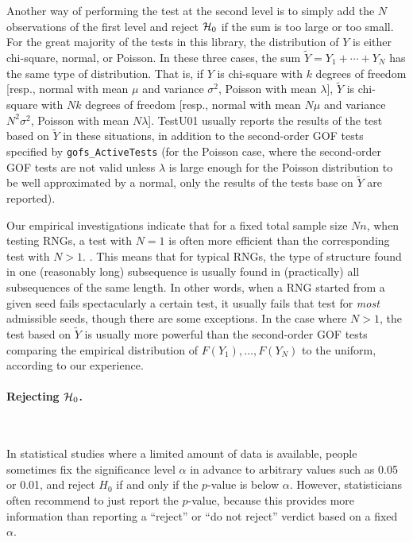 Another way of performing the test at the second level is to simply add
the $N$ observations of the first level 
and reject $\mathcal{H}_0$ if the sum is too large or too small.
For the great majority of the tests in this library, the distribution
of $Y$ is either chi-square, normal, or Poisson.
In these three cases, the sum $\tilde Y = Y_1 + \cdots + Y_N$ has the
same type of distribution.  That is, if $Y$ is chi-square with $k$ degrees
of freedom [resp., normal with mean $\mu$ and variance $\sigma^2$,
Poisson with mean $\lambda$], $\tilde Y$ is chi-square with $Nk$ degrees
of freedom [resp., normal with mean $N\mu$ and variance $N^2\sigma^2$,
Poisson with mean $N\lambda$].
TestU01 usually 
reports the results of the test based on $\tilde Y$ in
these situations, in addition to the second-order GOF tests specified
by {\tt gofs\_ActiveTests} (for the Poisson case, where the 
second-order GOF tests are not valid unless $\lambda$ is large enough
for the Poisson distribution to be well approximated by a normal,
only the results of the tests base on $\tilde Y$ are reported).

Our empirical investigations indicate that for a fixed total
sample size $Nn$, when testing RNGs, a test with $N=1$ is often
more efficient than the corresponding test with $N > 1$.
.
This means that for typical RNGs, the type of structure found in
one (reasonably long) subsequence is usually found in (practically)
all subsequences of the same length.
In other words, when a RNG started from a
given seed fails spectacularly a certain test, it usually fails
that test for {\em most\/} admissible seeds, though
there are some exceptions.
In the case where $N > 1$, the test based on $\tilde Y$ is usually
more powerful than the second-order GOF tests comparing the empirical
distribution of $F(Y_1),\dots,F(Y_N)$ to the uniform,
according to our experience.


\paragraph*{Rejecting $\mathcal{H}_0$.} \

In statistical studies where a limited amount of data is available,
people sometimes fix the significance level $\alpha$ in advance 
to arbitrary values such as 0.05 or 0.01,
and reject $H_0$ if and only if the $p$-value is below $\alpha$.
However, statisticians often recommend to just report the $p$-value,
because this provides more information than reporting a ``reject'' or
``do not reject'' verdict based on a fixed $\alpha$.


